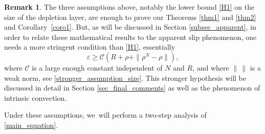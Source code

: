 \documentclass[JEP,XML,SOM,Unicode,NoEqCountersInSection,published]{cedram}
\let\epsilon\varepsilon
\theoremstyle{plain}
\theoremstyle{definition}
\newtheorem{rem}{Remark}[section]
\begin{document}
\begin{rem}
The three assumptions above, notably the lower bound \eqref{H1} on the size of the depletion layer, are enough to prove our Theorems \ref{thm1} and \ref{thm2} and Corollary~\ref{coro1}. But, as will be discussed in Section \ref{subsec_apparent}, in order to relate these mathematical results to the apparent slip phenomenon, one needs a more stringent condition than \eqref{H1}, essentially
\[
\epsilon \ge \mathcal{C} (R+ \rho+ \|\rho^N-\rho\|),
\]
where $\mathcal{C}$ is a large enough constant independent of $N$ and $R$, and where $\| \, \|$ is a weak norm, see \eqref{stronger_assumption_size}. This stronger hypothesis will be discussed in detail in Section \ref{sec_final_comments} as well as the phenomenon of intrinsic convection.
\end{rem}
Under these assumptions, we~will perform a two-step analysis of \eqref{main_equation}.
\end{document}
